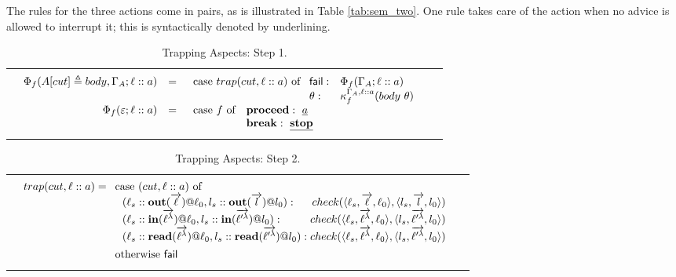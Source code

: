 \documentclass[a4paper]{llncs}
\makeatletter
\newcommand{\YZl}{l}
\newcommand{\Fail}{{\sf fail}}
\newcommand{\Lct}{\ell^\lambda}
\newcommand{\Lc}{\ell}
\newcommand{\Lett}{\ell'^\lambda}
\newcommand{\veck}[1]{\overrightarrow{#1}}
\newcommand{\Stop}{{\bf stop}}
\newenvironment{ARRAY}[1]{%
  \begin{tabular*}{\textwidth}{@{\extracolsep{\fill}}c@{}c@{}c}
  \hline
  &&\\[-5pt]
  &\begin{math}\begin{array}{@{} #1 @{}}
}
{ \end{array}\end{math}&\\
  &&\\[-5pt]
  \hline
  \end{tabular*}
}
\makeatother
\begin{document}
The rules for the %
three actions come in pairs, as is illustrated in
Table \ref{tab:sem_two}. One rule takes care of the action when no
advice is allowed to interrupt it; this is syntactically denoted by
underlining.  %

\begin{table}[h]
\begin{ARRAY}{rcl}
\Phi_f(A[cut] \triangleq body,\Gamma_A;\ell :: a) & = & 
\begin{array}[t]{l}
\hbox{case $trap(cut,\ell :: a)$ of}\ 
\begin{array}[t]{l@{\quad}l}
\Fail: & \Phi_f(\Gamma_A;\ell :: a) \\
\theta: & \kappa_f^{\Gamma_A,\ell :: a}(body \ \theta)\\
\end{array}
\end{array}
\\[3ex]
\Phi_f(\varepsilon;\ell :: a) & = &
\begin{array}[t]{ll}
\hbox{case $f$ of} &
  \mathbf{proceed}: \ \underline{a}\\
& \mathbf{break}:  \  \underline{\Stop}
\end{array}
\end{ARRAY}
\caption{Trapping Aspects: Step 1.} \label{tab:trapping_aspects_phi}
\end{table}
\vspace*{-1cm}
\begin{table}[h]
\begin{ARRAY}{l}
trap(cut,\ell :: a)= \begin{array}[t]{l}
\hbox{case $(cut,\ell :: a)$ of}\\
\ \ (\Lc{}_s::\mathbf{out}(\veck\Lc)@\Lc{}_0,
\YZl_s::\mathbf{out}(\veck\YZl)@\YZl_0): \hfill
check(\langle \Lc{}_s,\veck\Lc,\Lc{}_0 \rangle, \langle
\YZl_s,\veck\YZl,\YZl_0 \rangle )\\


\ \ (\Lc{}_s::\mathbf{in}(\veck\Lct)@\Lc{}_0,
\YZl_s::\mathbf{in}(\veck\Lett)@\YZl_0): \hfill
check(\langle \Lc{}_s,\veck\Lct,\Lc{}_0 \rangle, \langle
\YZl_s,\veck\Lett,\YZl_0 \rangle )\\

\ \ (\Lc{}_s::\mathbf{read}(\veck\Lct)@\Lc{}_0,
\YZl_s::\mathbf{read}(\veck\Lett)@\YZl_0):\hfill
check(\langle \Lc{}_s,\veck\Lct,\Lc{}_0 \rangle, \langle
\YZl_s,\veck\Lett,\YZl_0 \rangle )

\\[1ex] 

\hbox{otherwise \Fail}
\end{array}
\end{ARRAY}
\caption{Trapping Aspects: Step 2.}
\label{tab:trapping_aspects_trap}
\end{table}
\end{document}
